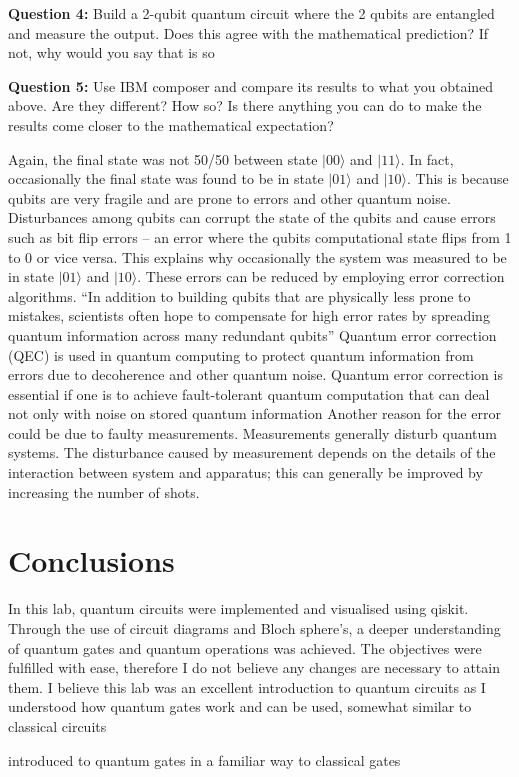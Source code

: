 \textbf{Question 4:}
Build a 2-qubit quantum circuit where the 2 qubits are entangled and measure the output. Does this agree with the mathematical prediction? If not, why would you say that is so

\textbf{Question 5:}
Use IBM composer and compare its results to what you obtained above. Are they different? How so? Is there anything you can do to make the results come closer to the mathematical expectation?

Again, the final state was not 50/50 between state $|00\rangle$ and $|11\rangle$. In fact, occasionally the final state was found to be in state $|01\rangle$ and $|10\rangle$. This is because qubits are very fragile and are prone to errors and other quantum noise.%
Disturbances among qubits can corrupt the state of the qubits and cause errors such as bit flip errors -- an error where the qubits computational state flips from 1 to 0 or vice versa. This explains why occasionally the system was measured to be in state $|01\rangle$ and $|10\rangle$. These errors can be reduced by employing error correction algorithms.
``In addition to building qubits that are physically less prone to mistakes, scientists often hope to compensate for high error rates by spreading quantum information across many redundant qubits''
Quantum error correction (QEC) is used in quantum computing to protect quantum information from errors due to decoherence and other quantum noise. Quantum error correction is essential if one is to achieve fault-tolerant quantum computation that can deal not only with noise on stored quantum information%
Another reason for the error could be due to faulty measurements. Measurements generally disturb quantum systems.%
The disturbance caused by measurement depends on the details of the interaction between system and apparatus; this can generally be improved by increasing the number of shots.

\section{Conclusions}

In this lab, quantum circuits were implemented and visualised using qiskit. Through the use of circuit diagrams and Bloch sphere's, a deeper understanding of quantum gates and quantum operations was achieved. The objectives were fulfilled with ease, therefore I do not believe any changes are necessary to attain them. I believe this lab was an excellent introduction to quantum circuits as I understood how quantum gates work and can be used, somewhat similar to classical circuits 

introduced to quantum gates in a familiar way to classical gates